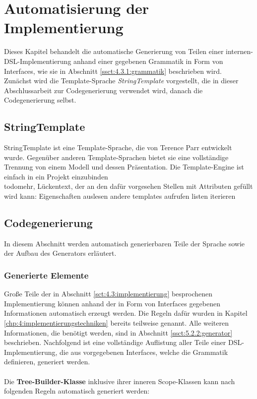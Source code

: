 
\chapter{Automatisierung der Implementierung}\label{chp:5:automatisierung}
Dieses Kapitel behandelt die automatische Generierung von Teilen einer internen-DSL-Implementierung anhand einer gegebenen Grammatik in Form von Interfaces, wie sie in Abschnitt \ref{ssct:4.3.1:grammatik} beschrieben wird.\\
Zunächst wird die Template-Sprache \emph{StringTemplate} vorgestellt, die in dieser Abschlussarbeit zur Codegenerierung verwendet wird, danach die Codegenerierung selbst.

\section{StringTemplate}\label{sct:5.1:st}
StringTemplate \cite{www:stringtemplate} ist eine Template-Sprache, die von Terence Parr entwickelt wurde. Gegenüber anderen Template-Sprachen bietet sie eine vollständige Trennung von einem Modell und dessen Präsentation. Die Template-Engine ist einfach in ein Projekt einzubinden\\todo{mehr},
Lückentext, der an den dafür vorgesehen Stellen mit Attributen gefüllt wird
kann:
Eigenschaften auslesen
andere templates aufrufen
listen iterieren


\section{Codegenerierung}\label{sct:5.2:codegenerierung}
In diesem Abschnitt werden automatisch generierbaren Teile der Sprache sowie der Aufbau des Generators erläutert.

\subsection{Generierte Elemente}\label{ssct:5.2.1:generiertes}
Große Teile der in Abschnitt \ref{sct:4.3:implementierung} besprochenen Implementierung können anhand der in Form von Interfaces gegebenen Informationen automatisch erzeugt werden. Die Regeln dafür wurden in Kapitel \ref{chp:4:implementierungstechniken} bereits teilweise genannt. Alle weiteren Informationen, die benötigt werden, sind in Abschnitt \ref{ssct:5.2.2:generator} beschrieben.
Nachfolgend ist eine vollständige Auflistung aller Teile einer DSL-Implementierung, die aus vorgegebenen Interfaces, welche die Grammatik definieren, generiert werden.
\\ \\ %
Die \textbf{Tree-Builder-Klasse} inklusive ihrer inneren Scope-Klassen kann nach folgenden Regeln automatisch generiert werden:

